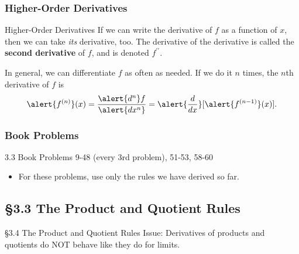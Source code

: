 \documentclass[cal1spr16Lectures.tex]{subfiles}
\begin{document}
\subsubsection{Higher-Order Derivatives}

\begin{frame}{\small Higher-Order Derivatives}
If we can write the derivative of $f$ as a function of $x$, then we can take \emph{its} derivative, too.  The derivative of the derivative is called the {\bf second derivative} of $f$, and is denoted $f^{\prime\prime}$.  

\vspace{1pc}
In general, we can differentiate $f$ as often as needed.  If we do it $n$ times, the $n$th derivative of $f$ is 
\[\alert{f^{(n)}}(x)=\frac{\alert{d^n} f}{\alert{dx^n}}=\alert{\frac{d}{dx}}[\alert{f^{(n-1)}}(x)].\]
\end{frame}

\subsubsection{Book Problems}

\begin{frame}{}
\begin{block}{3.3 Book Problems} 9-48 (every 3rd problem), 51-53, 58-60 \end{block} 
\begin{itemize}
\item For these problems, use only the rules we have derived so far.
\end{itemize}
\end{frame}

\subsection[3.4 The Product and Quotient Rules]{\S 3.3 The Product and Quotient Rules}

\begin{frame}{\S 3.4 The Product and Quotient Rules}
Issue: Derivatives of products and quotients do \alert{NOT} behave like they do for limits.  
\end{frame}
\end{document}
